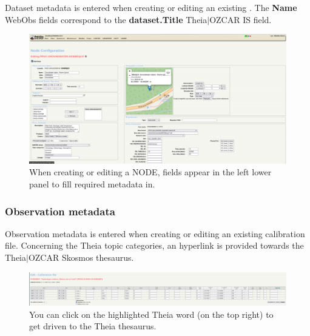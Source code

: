 Dataset metadata is entered when creating or editing an existing . The \textbf{Name} WebObs  fields correspond to the \textbf{dataset.Title} Theia$\vert$OZCAR IS field.

\begin{figure}[!h]
	\centering
	\includegraphics[width=\textwidth, scale=0.4]{figures/formNODE.png}
	\caption{When creating or editing a NODE, fields appear in the left lower panel to fill required metadata in.}
	\label{formNODE}
\end{figure}


\subsubsection{Observation metadata}

Observation metadata is entered when creating or editing an existing calibration file. Concerning the Theia topic categories, an hyperlink is provided towards the Theia$\vert$OZCAR Skosmos thesaurus.

\begin{figure}[!h]
	\centering
	\includegraphics[width=\textwidth]{figures/calib_file_form.png}
	\caption{You can click on the highlighted Theia word (on the top right) to get driven to the Theia thesaurus.}
	\label{formCLB}
\end{figure}

